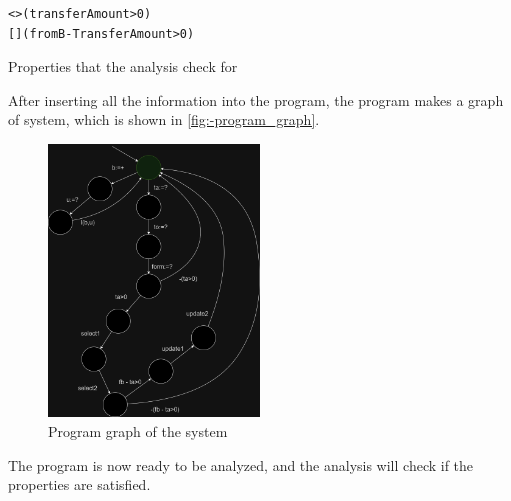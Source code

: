 \begin{listing}[htb!]
    \begin{verbatim}
<>(transferAmount>0)
[](fromB-TransferAmount>0)
        \end{verbatim}
\caption{Properties that the analysis check for}
\label{lst:properties}
    \end{listing}

After inserting all the information into the program, the program makes a graph of system, which is shown in \autoref{fig:-program_graph}.

\begin{figure}[htb!]
    \centering
    \includegraphics[width=0.5\textwidth]{figures/program_graph.png}
    \caption{Program graph of the system}
    \label{fig:-program_graph}
\end{figure}

The program is now ready to be analyzed, and the analysis will check if the properties are satisfied.

